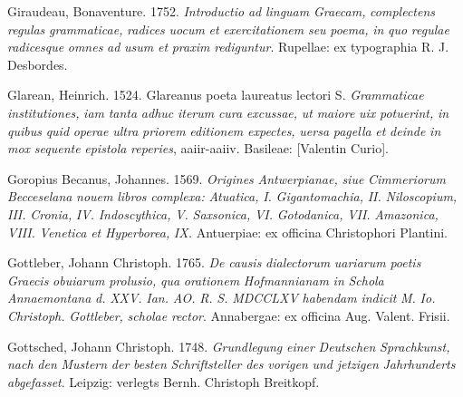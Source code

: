 Giraudeau, Bonaventure. 1752. \textit{Introductio} \textit{ad} \textit{linguam} \textit{Graecam,} \textit{complectens} \textit{regulas} \textit{grammaticae,} \textit{radices} \textit{uocum} \textit{et} \textit{exercitationem} \textit{seu} \textit{poema,} \textit{in} \textit{quo} \textit{regulae} \textit{radicesque} \textit{omnes} \textit{ad} \textit{usum} \textit{et} \textit{praxim} \textit{rediguntur}. Rupellae: ex typographia R. J. Desbordes.

Glarean, Heinrich. 1524. Glareanus poeta laureatus lectori S. \textit{Grammaticae} \textit{institutiones,} \textit{iam} \textit{tanta} \textit{adhuc} \textit{iterum} \textit{cura} \textit{excussae,} \textit{ut} \textit{maiore} \textit{uix} \textit{potuerint,} \textit{in} \textit{quibus} \textit{quid} \textit{operae} \textit{ultra} \textit{priorem} \textit{editionem} \textit{expectes,} \textit{uersa} \textit{pagella} \textit{et} \textit{deinde} \textit{in} \textit{mox} \textit{sequente} \textit{epistola} \textit{reperies}, aaiir-aaiiv. Basileae: [Valentin Curio].

Goropius Becanus, Johannes. 1569. \textit{Origines} \textit{Antwerpianae,} \textit{siue} \textit{Cimmeriorum} \textit{Becceselana} \textit{nouem} \textit{libros} \textit{complexa:} \textit{Atuatica,} \textit{I.} \textit{Gigantomachia,} \textit{II.} \textit{Niloscopium,} \textit{III.} \textit{Cronia,} \textit{IV.} \textit{Indoscythica,} \textit{V.} \textit{Saxsonica,} \textit{VI.} \textit{Gotodanica,} \textit{VII.} \textit{Amazonica,} \textit{VIII.} \textit{Venetica} \textit{et} \textit{Hyperborea,} \textit{IX.} Antuerpiae: ex officina Christophori Plantini.

Gottleber, Johann Christoph. 1765. \textit{De} \textit{causis} \textit{dialectorum} \textit{uariarum} \textit{poetis} \textit{Graecis} \textit{obuiarum} \textit{prolusio,} \textit{qua} \textit{orationem} \textit{Hofmannianam} \textit{in} \textit{Schola} \textit{Annaemontana} \textit{d.} \textit{XXV.} \textit{Ian.} \textit{AO.} \textit{R.} \textit{S.} \textit{MDCCLXV} \textit{habendam} \textit{indicit} \textit{M.} \textit{Io.} \textit{Christoph.} \textit{Gottleber,} \textit{scholae} \textit{rector}. Annabergae: ex officina Aug. Valent. Frisii.

Gottsched, Johann Christoph. 1748. \textit{Grundlegung} \textit{einer} \textit{Deutschen} \textit{Sprachkunst,} \textit{nach} \textit{den} \textit{Mustern} \textit{der} \textit{besten} \textit{Schriftsteller} \textit{des} \textit{vorigen} \textit{und} \textit{jetzigen} \textit{Jahrhunderts} \textit{abgefasset}. Leipzig: verlegts Bernh. Christoph Breitkopf.

